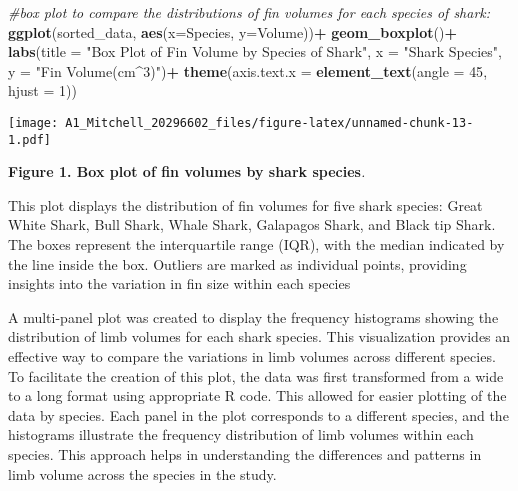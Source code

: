\documentclass[
]{article}
\newenvironment{Shaded}{\begin{snugshade}}{\end{snugshade}}
\newcommand{\AttributeTok}[1]{\textcolor[rgb]{0.13,0.29,0.53}{#1}}
\newcommand{\CommentTok}[1]{\textcolor[rgb]{0.56,0.35,0.01}{\textit{#1}}}
\newcommand{\DecValTok}[1]{\textcolor[rgb]{0.00,0.00,0.81}{#1}}
\newcommand{\FunctionTok}[1]{\textcolor[rgb]{0.13,0.29,0.53}{\textbf{#1}}}
\newcommand{\NormalTok}[1]{#1}
\newcommand{\SpecialCharTok}[1]{\textcolor[rgb]{0.81,0.36,0.00}{\textbf{#1}}}
\newcommand{\StringTok}[1]{\textcolor[rgb]{0.31,0.60,0.02}{#1}}
\begin{document}
\begin{Shaded}
\begin{Highlighting}[]
\CommentTok{\#box plot to compare the distributions of fin volumes for each species of shark:}
\FunctionTok{ggplot}\NormalTok{(sorted\_data, }\FunctionTok{aes}\NormalTok{(}\AttributeTok{x=}\NormalTok{Species, }\AttributeTok{y=}\NormalTok{Volume))}\SpecialCharTok{+}
  \FunctionTok{geom\_boxplot}\NormalTok{()}\SpecialCharTok{+}
  \FunctionTok{labs}\NormalTok{(}\AttributeTok{title =} \StringTok{"Box Plot of Fin Volume by Species of Shark"}\NormalTok{,}
       \AttributeTok{x =} \StringTok{"Shark Species"}\NormalTok{, }\AttributeTok{y =} \StringTok{"Fin Volume(cm\^{}3)"}\NormalTok{)}\SpecialCharTok{+}
  \FunctionTok{theme}\NormalTok{(}\AttributeTok{axis.text.x =} \FunctionTok{element\_text}\NormalTok{(}\AttributeTok{angle =} \DecValTok{45}\NormalTok{, }\AttributeTok{hjust =} \DecValTok{1}\NormalTok{))}
\end{Highlighting}
\end{Shaded}

\texttt{[image: A1\_Mitchell\_20296602\_files/figure-latex/unnamed-chunk-13-1.pdf]}

\textbf{Figure 1. Box plot of fin volumes by shark species}\emph{.}

This plot displays the distribution of fin volumes for five shark
species: Great White Shark, Bull Shark, Whale Shark, Galapagos Shark,
and Black tip Shark. The boxes represent the interquartile range (IQR),
with the median indicated by the line inside the box. Outliers are
marked as individual points, providing insights into the variation in
fin size within each species

A multi-panel plot was created to display the frequency histograms
showing the distribution of limb volumes for each shark species. This
visualization provides an effective way to compare the variations in
limb volumes across different species. To facilitate the creation of
this plot, the data was first transformed from a wide to a long format
using appropriate R code. This allowed for easier plotting of the data
by species. Each panel in the plot corresponds to a different species,
and the histograms illustrate the frequency distribution of limb volumes
within each species. This approach helps in understanding the
differences and patterns in limb volume across the species in the study.
\end{document}
